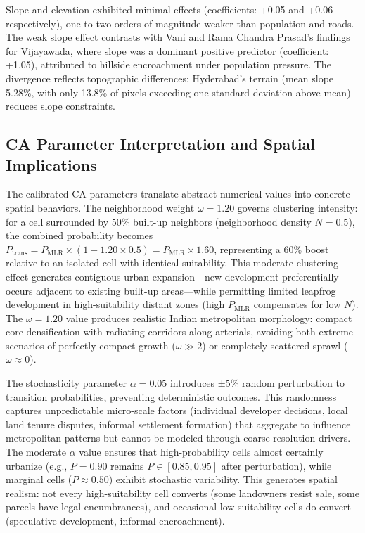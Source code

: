 \documentclass[12pt,a4paper]{article}
\begin{document}
Slope and elevation exhibited minimal effects (coefficients: +0.05 and +0.06 respectively), one to two orders of magnitude weaker than population and roads. The weak slope effect contrasts with Vani and Rama Chandra Prasad's \cite{vani2022} findings for Vijayawada, where slope was a dominant positive predictor (coefficient: +1.05), attributed to hillside encroachment under population pressure. The divergence reflects topographic differences: Hyderabad's terrain (mean slope 5.28\%, with only 13.8\% of pixels exceeding one standard deviation above mean) reduces slope constraints.

\subsection{CA Parameter Interpretation and Spatial Implications}

The calibrated CA parameters translate abstract numerical values into concrete spatial behaviors. The neighborhood weight $\omega=1.20$ governs clustering intensity: for a cell surrounded by 50\% built-up neighbors (neighborhood density $N=0.5$), the combined probability becomes $P_{\text{trans}} = P_{\text{MLR}} \times (1 + 1.20 \times 0.5) = P_{\text{MLR}} \times 1.60$, representing a 60\% boost relative to an isolated cell with identical suitability. This moderate clustering effect generates contiguous urban expansion—new development preferentially occurs adjacent to existing built-up areas—while permitting limited leapfrog development in high-suitability distant zones (high $P_{\text{MLR}}$ compensates for low $N$). The $\omega=1.20$ value produces realistic Indian metropolitan morphology: compact core densification with radiating corridors along arterials, avoiding both extreme scenarios of perfectly compact growth ($\omega \gg 2$) or completely scattered sprawl ($\omega \approx 0$).

The stochasticity parameter $\alpha=0.05$ introduces ±5\% random perturbation to transition probabilities, preventing deterministic outcomes. This randomness captures unpredictable micro-scale factors (individual developer decisions, local land tenure disputes, informal settlement formation) that aggregate to influence metropolitan patterns but cannot be modeled through coarse-resolution drivers. The moderate $\alpha$ value ensures that high-probability cells almost certainly urbanize (e.g., $P=0.90$ remains $P \in [0.85, 0.95]$ after perturbation), while marginal cells ($P \approx 0.50$) exhibit stochastic variability. This generates spatial realism: not every high-suitability cell converts (some landowners resist sale, some parcels have legal encumbrances), and occasional low-suitability cells do convert (speculative development, informal encroachment).
\end{document}
